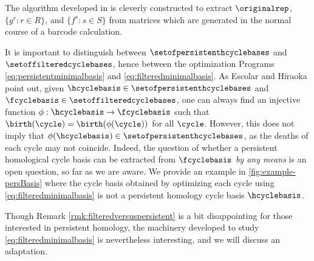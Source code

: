 
The algorithm developed in \cite{Escolar2016} is cleverly constructed to extract $\originalrep$, $\{g^r : r \in R\}$, and $\{f^s : s \in S\}$ from matrices which are generated in the normal course of a barcode calculation.


\begin{remark}
\label{rmk:filteredversuspersistent}
It is important to distinguish between  $\setofpersistenthcyclebases$ and $\setoffilteredcyclebases$, hence between the optimization Programs \eqref{eq:persistentminimalbasis} and \eqref{eq:filteredminimalbasis}.  As Escolar and Hiraoka \cite{Escolar2016} point out, given $\hcyclebasis \in \setofpersistenthcyclebases$ and $\fcyclebasis \in \setoffilteredcyclebases$, one can always find an injective function $\phi: \hcyclebasis \to \fcyclebasis$ such that $\birth(\cycle) = \birth(\phi(\cycle))$ for all $\cycle$.  However, this does not imply that $\phi(\hcyclebasis) \in \setofpersistenthcyclebases$, as the deaths of each cycle may not coincide.  Indeed, the question of whether a persistent homological cycle basis can be extracted from $\fcyclebasis$ \emph{by any means} is an open question, so far as we are aware. We provide an example in \fig \ref{fig:example-persBasis} where the cycle basis obtained by optimizing each cycle using \pr \eqref{eq:filteredminimalbasis} is not a persistent homology cycle basis $\hcyclebasis$. 
\end{remark}



Though Remark \ref{rmk:filteredversuspersistent} is a bit disappointing for those interested in persistent homology, the machinery developed to study \pr \eqref{eq:filteredminimalbasis} is nevertheless interesting, and we will discuss an adaptation.


